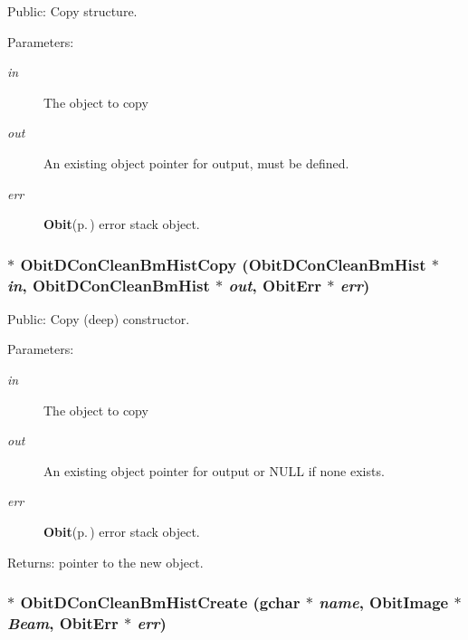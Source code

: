 Public: Copy structure. 

\begin{Desc}
\item[Parameters:]
\begin{description}
\item[{\em in}]The object to copy \item[{\em out}]An existing object pointer for output, must be defined. \item[{\em err}]{\bf Obit}{\rm (p.\,\pageref{structObit})} error stack object. \end{description}
\end{Desc}
\subsubsection{$\ast$ Obit\-DCon\-Clean\-Bm\-Hist\-Copy ({\bf Obit\-DCon\-Clean\-Bm\-Hist} $\ast$ {\em in}, {\bf Obit\-DCon\-Clean\-Bm\-Hist} $\ast$ {\em out}, {\bf Obit\-Err} $\ast$ {\em err})}\label{ObitDConCleanBmHist_8h_a7}


Public: Copy (deep) constructor. 

\begin{Desc}
\item[Parameters:]
\begin{description}
\item[{\em in}]The object to copy \item[{\em out}]An existing object pointer for output or NULL if none exists. \item[{\em err}]{\bf Obit}{\rm (p.\,\pageref{structObit})} error stack object. \end{description}
\end{Desc}
\begin{Desc}
\item[Returns:]pointer to the new object. \end{Desc}
\subsubsection{$\ast$ Obit\-DCon\-Clean\-Bm\-Hist\-Create (gchar $\ast$ {\em name}, {\bf Obit\-Image} $\ast$ {\em Beam}, {\bf Obit\-Err} $\ast$ {\em err})}\label{ObitDConCleanBmHist_8h_a5}


